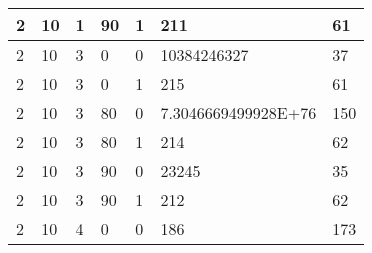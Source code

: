 \documentclass{article}
\theoremstyle{definition}
\begin{document}
\begin{table}[]
\begin{tabular}{|l|l|l|l|l|l|l|}
2                                      & 10                                      & 1                                      & 90                                   & 1                                      & 211                                      & 61                                     \\ \hline
2                                      & 10                                      & 3                                      & 0                                    & 0                                      & 10384246327                              & 37                                     \\ \hline
2                                      & 10                                      & 3                                      & 0                                    & 1                                      & 215                                      & 61                                     \\ \hline
2                                      & 10                                      & 3                                      & 80                                   & 0                                      & 7.3046669499928E+76                      & 150                                    \\ \hline
2                                      & 10                                      & 3                                      & 80                                   & 1                                      & 214                                      & 62                                     \\ \hline
2                                      & 10                                      & 3                                      & 90                                   & 0                                      & 23245                                    & 35                                     \\ \hline
2                                      & 10                                      & 3                                      & 90                                   & 1                                      & 212                                      & 62                                     \\ \hline
2                                      & 10                                      & 4                                      & 0                                    & 0                                      & 186                                      & 173                                    \\ \hline

\end{tabular}
\end{table}
\end{document}
